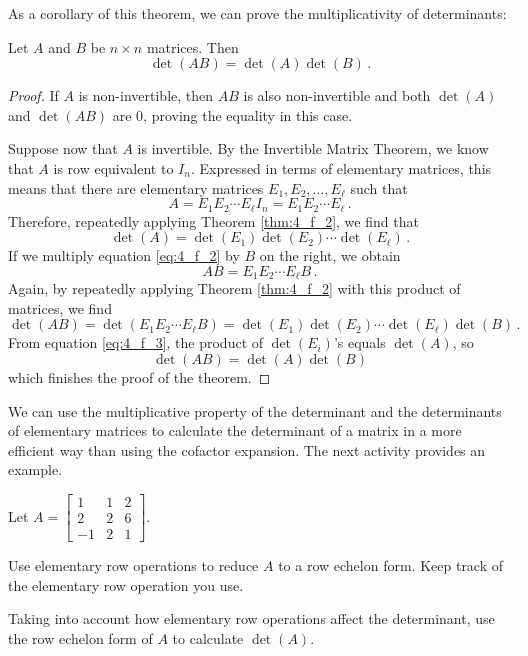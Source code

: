As a corollary of this theorem, we can prove the multiplicativity of determinants:



\begin{theorem} \label{thm:determinant_product} Let $A$ and $B$ be $n\times n$ matrices. Then
\[ \det(AB)=\det(A)\det(B) \,.\]
\end{theorem}

\begin{proof}
If $A$ is non-invertible, then $AB$ is also non-invertible and both $\det(A)$ and $\det(AB)$ are 0, proving the equality in this case.

Suppose now that $A$ is invertible. By the Invertible Matrix Theorem, we know that $A$ is row equivalent to $I_n$. Expressed in terms of elementary matrices, this means that there are elementary matrices $E_1, E_2, \ldots, E_\ell$ such that 
\begin{equation} \label{eq:4_f_2}  
A= E_1 E_2 \cdots E_\ell I_n = E_1 E_2 \cdots E_\ell \,. 
\end{equation}
Therefore, repeatedly applying Theorem \ref{thm:4_f_2}, we find that 
\begin{equation} \label{eq:4_f_3}  
\det(A) = \det(E_1) \det(E_2) \cdots \det(E_\ell) \, .
\end{equation}
If we multiply equation \eqref{eq:4_f_2} by $B$ on the right, we obtain
\[ AB = E_1 E_2 \cdots E_\ell B \,. \]
Again, by repeatedly applying Theorem \ref{thm:4_f_2} with this product of matrices, we find
\[ \det(AB) = \det(E_1 E_2 \cdots E_\ell B ) = \det(E_1) \det(E_2) \cdots \det(E_\ell) \det(B) \, .\]
From equation \eqref{eq:4_f_3}, the product of $\det(E_i)$'s equals $\det(A)$, so 
\[ \det(AB) = \det(A) \det(B) \]
which finishes the proof of the theorem.
\end{proof}



We can use the multiplicative property of the determinant and the determinants of elementary matrices to calculate the determinant of a matrix in a more efficient way than using the cofactor expansion. The next activity provides an example.



\begin{activity} \label{act:4_f_2} Let $A=\left[ \begin{array}{rcc} 1&1&2\\ 2&2&6\\ -1&2&1\end{array} \right]$.
\ba 
\item Use elementary row operations to reduce $A$ to a row echelon form. Keep track of the elementary row operation you use.


\item Taking into account how elementary row operations affect the determinant, use the row echelon form of $A$ to calculate $\det(A)$.


\ea 
\end{activity}




